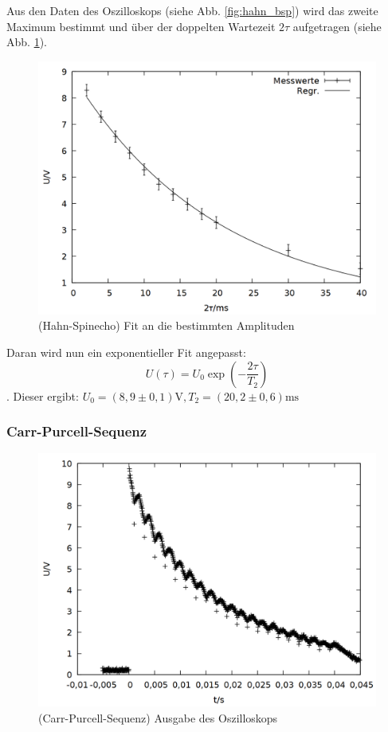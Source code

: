Aus den Daten des Oszilloskops (siehe Abb. \ref{fig:hahn_bsp}) wird das zweite Maximum bestimmt und über der doppelten Wartezeit $2\tau$ aufgetragen (siehe Abb. \ref{fig:hahn_data}).
\begin{figure}[h]
\centering
\includegraphics[width=0.75\linewidth]{data/p402_443_data/hahn_sequenz/out_hahn.png}
\caption{(Hahn-Spinecho) Fit an die bestimmten Amplituden}
\label{fig:hahn_data}
\end{figure}

Daran wird nun ein exponentieller Fit angepasst: $$U(\tau) = U_0\exp{\left(-\frac{2\tau}{T_2}\right)}$$. Dieser ergibt: $U_0 = (8,9\pm 0,1)\si{\volt}, T_2 = (20,2\pm 0,6) \si{\milli\second}$

\subsubsection{Carr-Purcell-Sequenz}
\begin{figure}[h]
\centering
\includegraphics[width=0.75\linewidth]{data/p402_443_data/carr_purcell_sequenz/plot_156.png}
\caption{(Carr-Purcell-Sequenz) Ausgabe des Oszilloskops}
\label{fig:carr_raw}
\end{figure}

